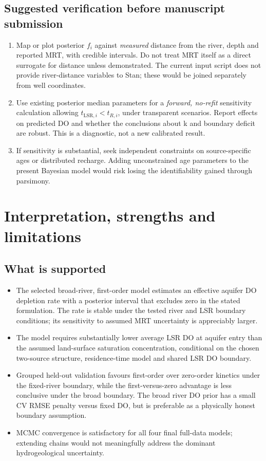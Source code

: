 \documentclass[11pt,a4paper]{article}
\newcommand{\LSR}{\mathrm{LSR}}
\begin{document}
\subsection{Suggested verification before manuscript submission}
\begin{enumerate}
\item Map or plot posterior \(f_i\) against \emph{measured} distance from the river, depth and reported MRT, with credible intervals. Do not treat MRT itself as a direct surrogate for distance unless demonstrated. The current input script does not provide river-distance variables to Stan; these would be joined separately from well coordinates.
\item Use existing posterior median parameters for a \emph{forward, no-refit} sensitivity calculation allowing \(t_{\LSR,i}<t_{R,i}\), under transparent scenarios. Report effects on predicted DO and whether the conclusions about k and boundary deficit are robust. This is a diagnostic, not a new calibrated result.
\item If sensitivity is substantial, seek independent constraints on source-specific ages or distributed recharge. Adding unconstrained age parameters to the present Bayesian model would risk losing the identifiability gained through parsimony.
\end{enumerate}

\section{Interpretation, strengths and limitations}
\subsection{What is supported}
\begin{itemize}
\item The selected broad-river, first-order model estimates an effective aquifer DO depletion rate with a posterior interval that excludes zero in the stated formulation. The rate is stable under the tested river and LSR boundary conditions; its sensitivity to assumed MRT uncertainty is appreciably larger.
\item The model requires substantially lower average LSR DO at aquifer entry than the assumed land-surface saturation concentration, conditional on the chosen two-source structure, residence-time model and shared LSR DO boundary.
\item Grouped held-out validation favours first-order over zero-order kinetics under the fixed-river boundary, while the first-versus-zero advantage is less conclusive under the broad boundary. The broad river DO prior has a small CV RMSE penalty versus fixed DO, but is preferable as a physically honest boundary assumption.
\item MCMC convergence is satisfactory for all four final full-data models; extending chains would not meaningfully address the dominant hydrogeological uncertainty.
\end{itemize}
\end{document}
